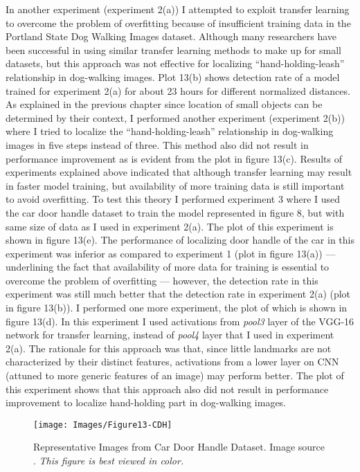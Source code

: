 \documentclass [11pt,letterpaper ,openany ]{report}
\begin{document}
    In another experiment (experiment 2(a)) I attempted to exploit transfer learning to overcome the problem of overfitting because of insufficient training data in the Portland State Dog Walking Images dataset. Although many researchers \cite{oquab2014learning,ahmed2008training,collobert2011natural} have been successful in using similar transfer learning methods to make up for small datasets, but this approach was not effective for localizing ``hand-holding-leash'' relationship in dog-walking images. Plot 13(b) shows detection rate of a model trained for experiment 2(a) for about 23 hours for different normalized distances. As explained in the previous chapter since location of small objects can be determined by their context, I performed another experiment (experiment 2(b)) where I tried to localize the ``hand-holding-leash'' relationship in dog-walking images in five steps instead of three. This method also did not result in performance improvement as is evident from the plot in figure 13(c). Results of experiments explained above indicated that although transfer learning may result in faster model training, but availability of more training data is still important to avoid overfitting. To test this theory I performed experiment 3 where I used the car door handle dataset to train the model represented in figure 8, but with same size of data as I used in experiment 2(a). The plot of this experiment is shown in figure 13(e). The performance of localizing door handle of the car in this experiment was inferior as compared to experiment 1 (plot in figure 13(a)) --- underlining the fact that availability of more data for training is essential to overcome the problem of overfitting --- however, the detection rate in this experiment was still much better that the detection rate in experiment 2(a) (plot in figure 13(b)). I performed one more experiment, the plot of which is shown in figure 13(d). In this experiment I used activations from \textit{pool3} layer of the VGG-16 network for transfer learning, instead of \textit{pool4} layer that I used in experiment 2(a). The rationale for this approach was that, since little landmarks are not characterized by their distinct features, activations from a lower layer on CNN (attuned to more generic features of an image) may perform better. The plot of this experiment shows that this approach also did not result in performance improvement to localize hand-holding part in dog-walking images. 

    \begin{figure}[b!]
      \centering
      \texttt{[image: Images/Figure13-CDH]}
      \caption{Representative Images from Car Door Handle Dataset. Image source \cite{Singh_2016_CVPR}. \textit{This figure is best viewed in color.}}
      \label{fig:cdh}
    \end{figure}        
\end{document}
